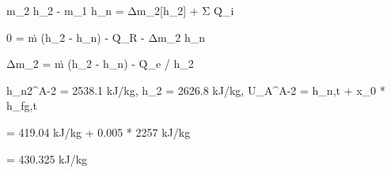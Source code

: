 m_2 h_2 - m_1 h_n = Δm_2[h_2] + Σ Q̇_i

0 = ṁ (h_2 - h_n) - Q̇_R - Δm_2 h_n

Δm_2 = ṁ (h_2 - h_n) - Q̇_e / h_2

h_n2^A-2 = 2538.1 kJ/kg, h_2 = 2626.8 kJ/kg, U_A^A-2 = h_n,t + x_0 * h_fg,t

= 419.04 kJ/kg + 0.005 * 2257 kJ/kg

= 430.325 kJ/kg